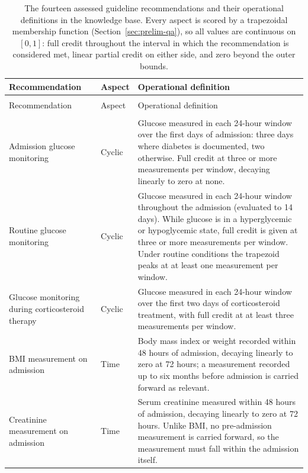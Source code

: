 \begingroup
\singlespacing
\small
\setlength{\tabcolsep}{4pt}
\begin{longtable}{
>{\raggedright\arraybackslash}p{}
>{\raggedright\arraybackslash}p{}
>{\raggedright\arraybackslash}p{}
}
\caption{The fourteen assessed guideline recommendations and their operational definitions in the knowledge base. Every aspect is scored by a trapezoidal membership function (Section~\ref{sec:prelim-qa}), so all values are continuous on $[0,1]$: full credit throughout the interval in which the recommendation is considered met, linear partial credit on either side, and zero beyond the outer bounds.}
\label{tab:pattern-definitions}\\
\toprule
Recommendation & Aspect & Operational definition \\
\midrule
\endfirsthead
\multicolumn{3}{l}{\footnotesize\itshape Table \thetable\ continued from previous page}\\
\toprule
Recommendation & Aspect & Operational definition \\
\midrule
\endhead
\midrule
\multicolumn{3}{r}{\footnotesize\itshape continued on next page}\\
\endfoot
\bottomrule
\endlastfoot
Admission glucose monitoring & Cyclic &
Glucose measured in each 24-hour window over the first days of admission: three days where diabetes is documented, two otherwise. Full credit at three or more measurements per window, decaying linearly to zero at none. \\[2pt]
Routine glucose monitoring & Cyclic &
Glucose measured in each 24-hour window throughout the admission (evaluated to 14 days). While glucose is in a hyperglycemic or hypoglycemic state, full credit is given at three or more measurements per window. Under routine conditions the trapezoid peaks at at least one measurement per window. \\[2pt]
Glucose monitoring during corticosteroid therapy & Cyclic &
Glucose measured in each 24-hour window over the first two days of corticosteroid treatment, with full credit at at least three measurements per window. \\[2pt]
BMI measurement on admission & Time &
Body mass index or weight recorded within 48 hours of admission, decaying linearly to zero at 72 hours; a measurement recorded up to six months before admission is carried forward as relevant. \\[2pt]
Creatinine measurement on admission & Time &
Serum creatinine measured within 48 hours of admission, decaying linearly to zero at 72 hours. Unlike BMI, no pre-admission measurement is carried forward, so the measurement must fall within the admission itself. \\[2pt]

\end{longtable}
